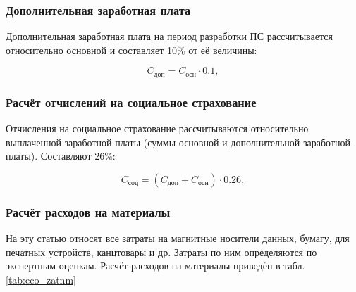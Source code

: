 \subsubsection*{Дополнительная заработная плата}
Дополнительная заработная плата на период разработки ПС рассчитывается относительно основной и составляет 10\% от её величины:

\begin{equation}
C_{\mbox{доп}} = C_{\mbox{осн}} \cdot 0.1,
\end{equation}

\subsubsection*{Расчёт отчислений на социальное страхование}
Отчисления на социальное страхование рассчитываются относительно выплаченной заработной платы (суммы основной и
дополнительной заработной платы). Составляют 26\%:

\begin{equation}
C_{\mbox{соц}} = (C_{\mbox{доп}} + C_{\mbox{осн}}) \cdot 0.26,
\end{equation}

\subsubsection*{Расчёт расходов на материалы}
На эту статью относят все затраты на магнитные носители данных, бумагу, для печатных устройств, канцтовары и др.
Затраты по ним определяются по экспертным оценкам. Расчёт расходов на материалы приведён в табл. \ref{tab:eco_zatnm}

